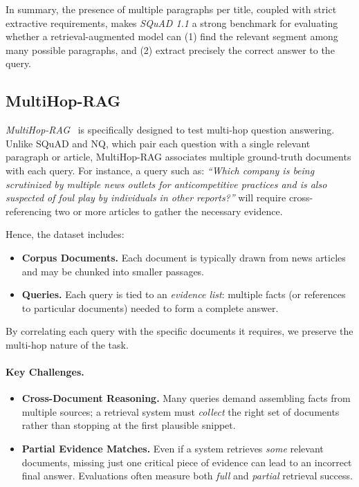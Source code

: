 In summary, the presence of multiple paragraphs per title, coupled with strict extractive requirements, 
makes \emph{SQuAD 1.1} a strong benchmark for evaluating whether a retrieval-augmented model can 
(1) find the relevant segment among many possible paragraphs, and 
(2) extract precisely the correct answer to the query.
\fi

\subsection{MultiHop-RAG} \emph{MultiHop-RAG}~\cite{multihoprag-paper} is specifically designed to test multi-hop question answering. 
Unlike SQuAD and NQ, which pair each question with a single relevant paragraph or article, 
MultiHop-RAG associates multiple ground-truth documents with each query. 
For instance, a query such as:
\emph{``Which company is being scrutinized by multiple news outlets for anticompetitive practices 
and is also suspected of foul play by individuals in other reports?''}
will require cross-referencing two or more articles to gather the necessary evidence. 

\iffalse
Hence, the dataset includes:
\begin{itemize}
    \item \textbf{Corpus Documents.} Each document is typically drawn from news articles and may be chunked into smaller passages.
    \item \textbf{Queries.} Each query is tied to an \emph{evidence list}: multiple facts (or references to particular documents) needed to form a complete answer.
\end{itemize}

By correlating each query with the specific documents it requires, we preserve the multi-hop nature of the task.

\paragraph{Key Challenges.}
\begin{itemize}
    \item \textbf{Cross-Document Reasoning.} Many queries demand assembling facts from multiple sources; 
    a retrieval system must \emph{collect} the right set of documents rather than stopping at the first plausible snippet.
    \item \textbf{Partial Evidence Matches.} Even if a system retrieves \emph{some} relevant documents, 
    missing just one critical piece of evidence can lead to an incorrect final answer. 
    Evaluations often measure both \emph{full} and \emph{partial} retrieval success.
\end{itemize}

